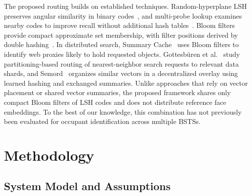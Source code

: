 \documentclass[pdflatex,sn-mathphys-num]{sn-jnl}%
\theoremstyle{thmstyleone}%
\theoremstyle{thmstyletwo}%
\theoremstyle{thmstylethree}%
\begin{document}
The proposed routing builds on established techniques. Random-hyperplane LSH preserves angular similarity in binary codes~\cite{charikar2002}, and multi-probe lookup examines nearby codes to improve recall without additional hash tables~\cite{lv2007}. Bloom filters~\cite{bloom1970} provide compact approximate set membership, with filter positions derived by double hashing~\cite{kirsch2006}. In distributed search, Summary Cache~\cite{fan2000} uses Bloom filters to identify web proxies likely to hold requested objects. Gottesb{\"u}ren et al.~\cite{gottesbueren2024} study partitioning-based routing of nearest-neighbor search requests to relevant data shards, and Semord~\cite{wang2026semord} organizes similar vectors in a decentralized overlay using learned hashing and exchanged summaries. Unlike approaches that rely on vector placement or shared vector summaries, the proposed framework shares only compact Bloom filters of LSH codes and does not distribute reference face embeddings. To the best of our knowledge, this combination has not previously been evaluated for occupant identification across multiple BSTSs.

\section{Methodology}
\label{sec:methodology}

\subsection{System Model and Assumptions}
\label{subsec:system_model}
\end{document}

